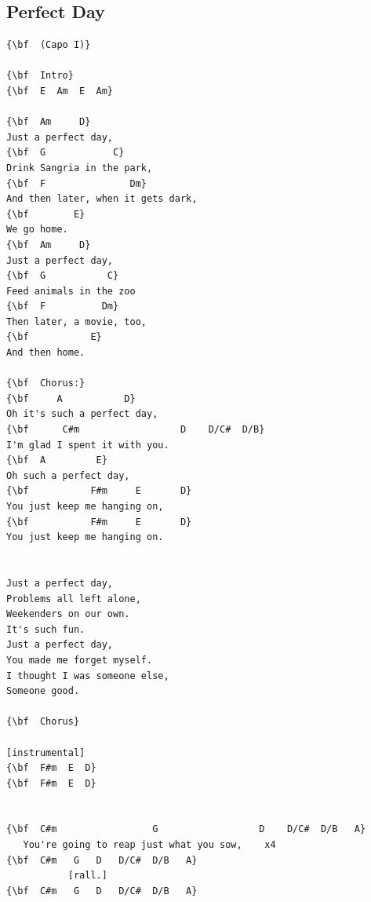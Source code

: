 \documentclass[a4paper]{article}
\begin{document}
\subsection{Perfect Day}
\begin{Verbatim}[commandchars=\\\{\}]
{\bf  (Capo I)}

{\bf  Intro}
{\bf  E  Am  E  Am}

{\bf  Am     D}
Just a perfect day,
{\bf  G            C}
Drink Sangria in the park,
{\bf  F               Dm}
And then later, when it gets dark, 
{\bf        E}
We go home.
{\bf  Am     D}
Just a perfect day,
{\bf  G           C}
Feed animals in the zoo
{\bf  F          Dm}
Then later, a movie, too,
{\bf           E}
And then home.

{\bf  Chorus:}
{\bf     A           D}
Oh it's such a perfect day, 
{\bf      C#m                  D    D/C#  D/B}
I'm glad I spent it with you.
{\bf  A         E}
Oh such a perfect day,
{\bf           F#m     E       D}
You just keep me hanging on,
{\bf           F#m     E       D}
You just keep me hanging on.


Just a perfect day,
Problems all left alone,
Weekenders on our own.
It's such fun.
Just a perfect day,
You made me forget myself.
I thought I was someone else,
Someone good.

{\bf  Chorus}

[instrumental]
{\bf  F#m  E  D}
{\bf  F#m  E  D}


{\bf  C#m                 G                  D    D/C#  D/B   A}
   You're going to reap just what you sow,    x4
{\bf  C#m   G   D   D/C#  D/B   A}
           [rall.]
{\bf  C#m   G   D   D/C#  D/B   A}

\end{Verbatim}
\newpage
\end{document}
